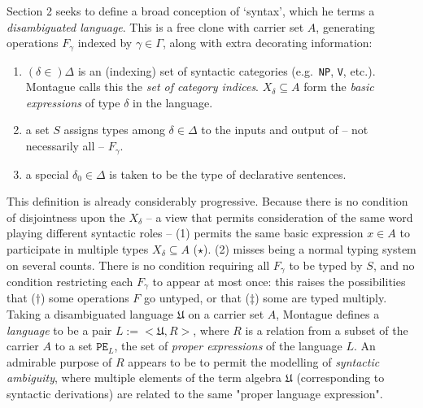 Section 2 seeks to define a broad conception of `syntax', which he terms a \emph{disambiguated language}. This is a free clone with carrier set $A$, generating operations $F_\gamma$ indexed by $\gamma \in \Gamma$, along with extra decorating information:

\begin{enumerate}
\item{$(\delta \in) \Delta$ is an (indexing) set of syntactic categories (e.g.~\texttt{NP}, \texttt{V}, etc.). Montague calls this the \emph{set of category indices}. $X_\delta \subseteq A$ form the \emph{basic expressions} of type $\delta$ in the language.}
\item{a set $S$ assigns types among $\delta \in \Delta$ to the inputs and output of -- not necessarily all -- $F_\gamma$.}
\item{a special $\delta_0 \in \Delta$ is taken to be the type of declarative sentences.}
\end{enumerate}

This definition is already considerably progressive. Because there is no condition of disjointness upon the $X_\delta$ -- a view that permits consideration of the same word playing different syntactic roles -- (1) permits the same basic expression $x \in A$ to participate in multiple types $X_\delta \subseteq A$ ($\star$). (2) misses being a normal typing system on several counts. There is no condition requiring all $F_\gamma$ to be typed by $S$, and no condition restricting each $F_\gamma$ to appear at most once: this raises the possibilities that ($\dag$) some operations $F$ go untyped, or that ($\ddag$) some are typed multiply.\\

Taking a disambiguated language $\mathfrak{U}$ on a carrier set $A$, Montague defines a \emph{language} to be a pair $L := <\mathfrak{U}, R>$, where $R$ is a relation from a subset of the carrier $A$ to a set $\texttt{PE}_L$, the set of \emph{proper expressions} of the language $L$. An admirable purpose of $R$ appears to be to permit the modelling of \emph{syntactic ambiguity}, where multiple elements of the term algebra $\mathfrak{U}$ (corresponding to syntactic derivations) are related to the same "proper language expression".\\

